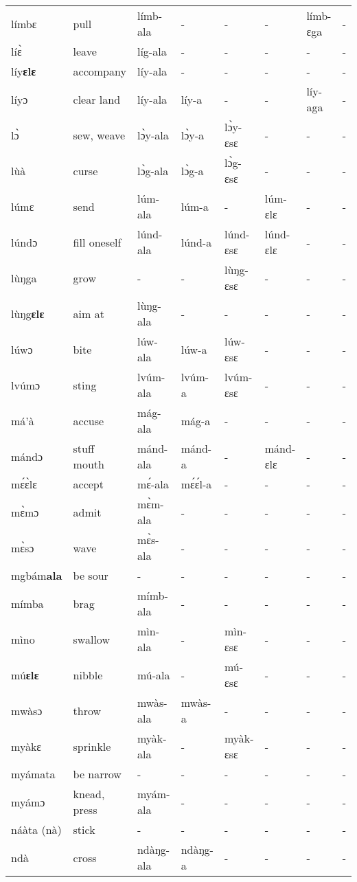 \begin{sidewaystable}
\begin{longtable}{lp{3.5cm}llllll}
límbɛ & pull & límb-ala & - & - & - & límb-ɛga & - \\
líɛ̀ & leave & líg-ala & - & - & - & - & - \\
líy{\bfseries ɛlɛ} & accompany & líy-ala & - & - & - & - & - \\
líyɔ & clear land & líy-ala &  líy-a & - & - & líy-aga & - \\
lɔ̀ & sew, weave & lɔ̀y-ala & lɔ̀y-a & lɔ̀y-ɛsɛ & - & - & - \\
lùà & curse & lɔ̀g-ala & lɔ̀g-a & lɔ̀g-ɛsɛ & - & - & - \\
lúmɛ & send & lúm-ala & lúm-a & - &  lúm-ɛlɛ & - & - \\
lúndɔ & fill oneself & lúnd-ala & lúnd-a & lúnd-ɛsɛ & lúnd-ɛlɛ & - & - \\
lùŋga & grow & - &  - & lùŋg-ɛsɛ & - & - & - \\
lùŋg{\bfseries ɛlɛ} & aim at & lùŋg-ala & - & - & - & - & - \\
lúwɔ & bite & lúw-ala & lúw-a & lúw-ɛsɛ & - & - & - \\
lvúmɔ & sting & lvúm-ala & lvúm-a & lvúm-ɛsɛ & - & - & - \\
má'à & accuse & mág-ala &  mág-a & - & - & - & - \\
mándɔ & stuff mouth & mánd-ala & mánd-a & - &  mánd-ɛlɛ & - & - \\
mɛ́ɛ̀lɛ & accept & mɛ́-ala & mɛ́ɛ́l-a & - & - & - & - \\
mɛ̀mɔ & admit & mɛ̀m-ala & - & - & -  & - & - \\
mɛ̀sɔ & wave & mɛ̀s-ala & - & - & -  & - & - \\
mgbám{\bfseries ala} & be sour & - & - & - &  - & - & - \\
mímba & brag & mímb-ala & - & - & - & - & - \\
mìno & swallow & mìn-ala & - & mìn-ɛsɛ & - &  - & - \\
mú{\bfseries ɛlɛ} & nibble & mú-ala & - & mú-ɛsɛ & - & - & - \\
mwàsɔ & throw & mwàs-ala & mwàs-a & - & - & - & - \\
myàkɛ & sprinkle & myàk-ala & - & myàk-ɛsɛ & - &  - & - \\
myámata & be narrow & - & - & - & - & - & - \\
myámɔ & knead, press & myám-ala & - & - & - & - & - \\
náàta (nà) & stick & - & - & - & - & - & - \\
ndà & cross & ndàŋg-ala & ndàŋg-a & - &  - & - & - \\

\end{longtable}
\end{sidewaystable}
